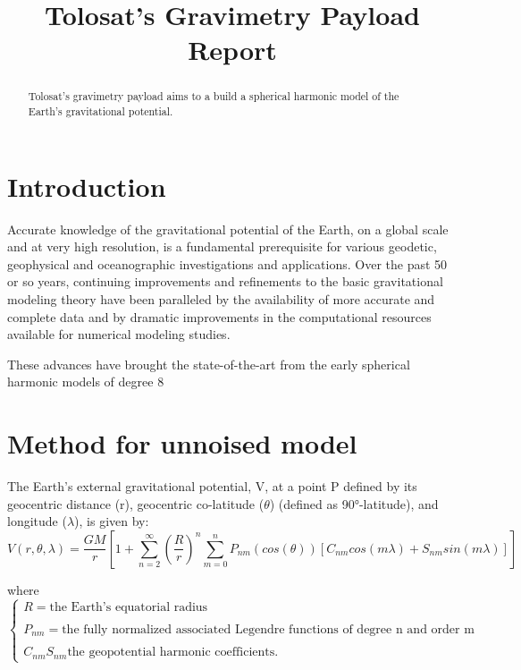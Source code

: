\documentclass{article}
\title{Tolosat's Gravimetry Payload Report}
\author{}
\begin{document}
\maketitle

\begin{abstract}
Tolosat's gravimetry payload aims to a build a spherical harmonic model of the Earth's gravitational potential.

\end{abstract}

\section{Introduction}
Accurate knowledge of the gravitational potential of the Earth, 
on a global scale and at very high resolution, is a fundamental prerequisite 
for various geodetic, geophysical and oceanographic investigations and applications. 
Over the past 50 or so years, continuing improvements and refinements to the 
basic gravitational modeling theory have been paralleled by the availability 
of more accurate and complete data and by dramatic improvements in the 
computational resources available for numerical modeling studies. 

These advances have brought the state-of-the-art from the early spherical harmonic models of degree 8 
\cite{1952Tegf}

\section{Method for unnoised model}

The Earth's external gravitational potential, V, 
at a point P defined by its geocentric distance (r), 
geocentric co-latitude ($\theta$) (defined as 90°-latitude), 
and longitude ($\lambda$), is given by:
\begin{equation}
        V (r, \theta, \lambda) = \frac{GM}{r}  \left[1 + \sum_{n = 2}^{\infty} \left(\frac{R}{r}\right)^{n} \sum_{m = 0}^{n} P_{nm}(cos(\theta)) \left[C_{nm}cos(m\lambda) + S_{nm} sin(m\lambda)\right]    \right] 
\end{equation}

where
\begin{equation*}
    \left\{
                \begin{array}{ll}
                R = \text{the Earth’s equatorial radius} \\
                \\
                P_{nm} = \text{the fully normalized associated Legendre
    functions of degree n and order m}\\
    \\
                C_{nm} S_{nm} \text{the geopotential harmonic coefficients. }
                \end{array}
    \right .
\end{equation*}
\end{document}
